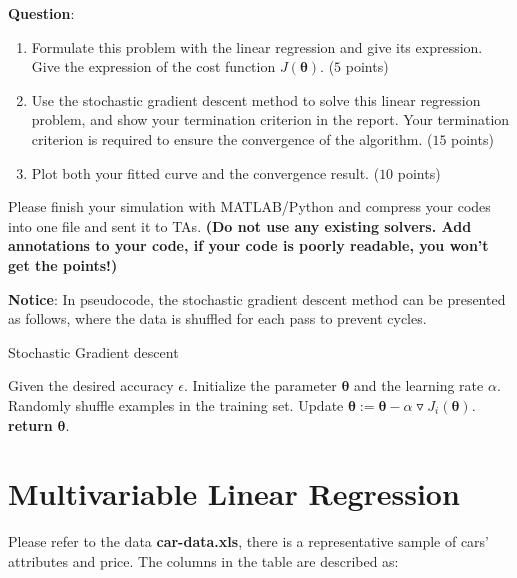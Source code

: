 \documentclass{article}
\begin{document}
\textbf{Question}: 
\begin{enumerate}[(1)]
	\item Formulate this problem with the linear regression and give its expression. Give the expression of the cost function $J(\bm \theta)$. ($5$ points)
	\item Use the stochastic gradient descent method to solve this linear regression problem, and show your termination criterion in the report. Your termination criterion is required to ensure the convergence of the algorithm. ($15$ points) 
	\item Plot both your fitted curve and the convergence result. ($10$ points)
\end{enumerate}
Please finish your simulation with MATLAB/Python and compress your codes into one file and sent it to TAs.  \textbf{(Do not use any existing solvers. Add annotations to your code, if your code is poorly readable, you won't get the points!)}

\textbf{Notice}:
In pseudocode, the stochastic gradient descent method can be presented as follows, where the data is shuffled for each pass to prevent cycles.

\begin{algorithm}
	\caption{Stochastic Gradient descent}
	\label{a.af}
	\begin{algorithmic}[1]
		\STATE Given the desired accuracy $\epsilon$.
		\STATE  Initialize the parameter $\bm \theta$ and the learning rate $\alpha$.
		\REPEAT
		\STATE Randomly shuffle examples in the training set.
		\STATE Update $\bm \theta:=\bm \theta-\alpha \triangledown J_i(\bm \theta)$.
		\ENDFOR
		\STATE \textbf{return} $\bm \theta$.
	\end{algorithmic}
\end{algorithm}



\section{Multivariable Linear Regression}

Please refer to the data \textbf{car-data.xls}, there is a representative sample of cars' attributes and price. 
The columns in the table are described as:
\end{document}
